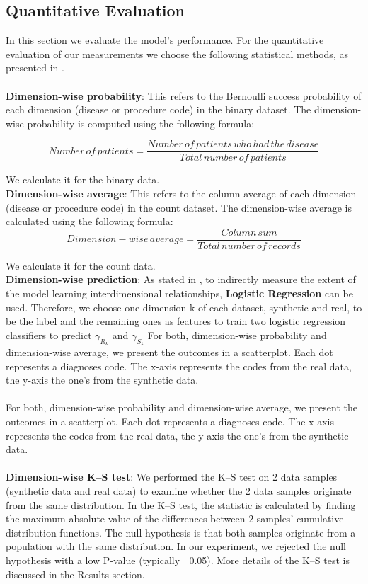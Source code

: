 \documentclass[11pt, a4paper]{book}
\begin{document}
\subsection{Quantitative Evaluation}
In this section we evaluate the model's performance. For the quantitative evaluation of our measurements we choose the following statistical methods, as presented in \cite{Choi2017}.
\\
\\
\textbf{Dimension-wise probability}: This refers to the Bernoulli success probability of each dimension (disease or procedure code) in the binary dataset. The dimension-wise probability is computed using the following formula: 

\begin{equation}
Number\,of\,patients = \frac{Number\,of\,patients\, who \,had \,the \,disease}{Total \,number \,of \,patients}
\end{equation}

We calculate it for the binary data.
\\

\textbf{Dimension-wise average}: This refers to the column average of each dimension (disease or procedure code) in the count dataset. The dimension-wise average is calculated using the following formula: 
\begin{equation}
Dimension-wise\,average = \frac{Column \,sum}{Total \,number \,of \,records}
\end{equation}

We calculate it for the count data.
\\

\textbf{Dimension-wise prediction}: As stated in \cite{Choi2017}, to indirectly measure the extent of the model learning interdimensional relationships, \textbf{Logistic Regression} can be used. Therefore, we choose one dimension k of each dataset, synthetic and real, to be the label and the remaining  ones as features to train two logistic regression classifiers to predict $\gamma_R_k$ and $\gamma_S_k$
For both, dimension-wise probability and dimension-wise average, we present the outcomes in a scatterplot. Each dot represents a diagnoses code. The x-axis represents the codes from the real data, the y-axis the one's from the synthetic data.
\\
\\
For both, dimension-wise probability and dimension-wise average, we present the outcomes in a scatterplot. Each dot represents a diagnoses code. The x-axis represents the codes from the real data, the y-axis the one's from the synthetic data.
\\
\\
\textbf{Dimension-wise K–S test}: We performed the K–S test on 2 data samples (synthetic data and real data) to examine whether the 2 data samples originate from the same distribution. In the K–S test, the statistic is calculated by finding the maximum absolute value of the differences between 2 samples’ cumulative distribution functions. The null hypothesis is that both samples originate from a population with the same distribution. In our experiment, we rejected the null hypothesis with a low P-value (typically 􏰆 0.05). More details of the K–S test is discussed in the Results section. 
\end{document}
